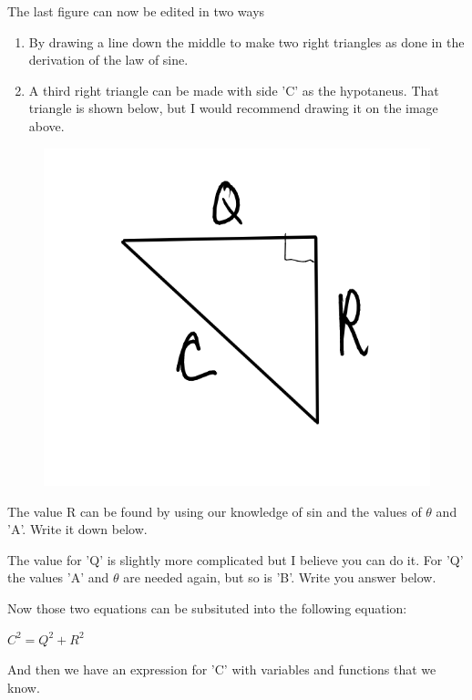 \documentclass[12pt]{article}
\begin{document}
The last figure can now be edited in two ways
\begin{enumerate}
  \item By drawing a line down the middle to make two right triangles as done in the derivation of the law of sine.
  \item A third right triangle can be made with side 'C' as the hypotaneus. That triangle is shown below, but I would recommend drawing it on the image above.
\end{enumerate}

\begin{figure}[h]
\includegraphics[scale=0.2]{lawOfCosinsQRC2.png}
\end{figure}

The value R can be found by using our knowledge of sin and the values of $\theta$ and 'A'. Write it down below.

\parbox[][4cm][t]{8cm}{}

The value for 'Q' is slightly more complicated but I believe you can do it. For 'Q' the values 'A' and $\theta$ are needed again, but so is 'B'. Write you answer below.

\parbox[][4cm][t]{8cm}{}

Now those two equations can be subsituted into the following equation:

$C^2 = Q^2 + R^2$

And then we have an expression for 'C' with variables and functions that we know.
\end{document}

